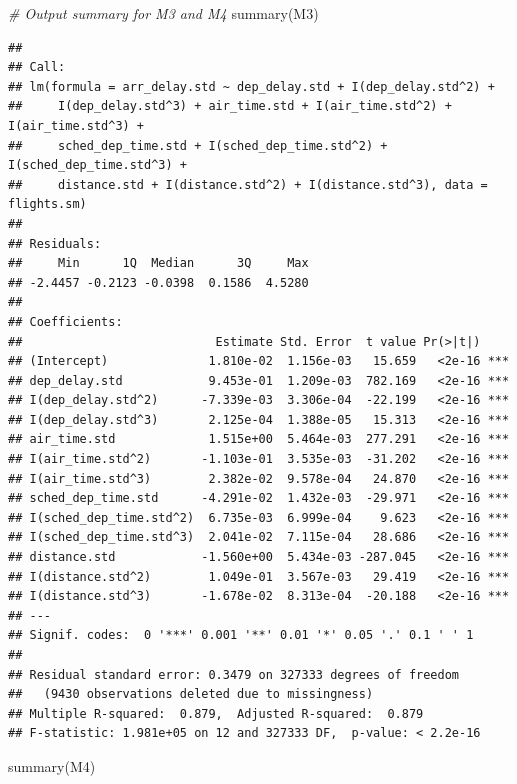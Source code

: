 \documentclass[
]{article}
\newenvironment{Shaded}{\begin{snugshade}}{\end{snugshade}}
\newcommand{\CommentTok}[1]{\textcolor[rgb]{0.56,0.35,0.01}{\textit{#1}}}
\newcommand{\FunctionTok}[1]{\textcolor[rgb]{0.00,0.00,0.00}{#1}}
\newcommand{\NormalTok}[1]{#1}
\begin{document}
\begin{Shaded}
\begin{Highlighting}[]
\CommentTok{\# Output summary for M3 and M4}
\FunctionTok{summary}\NormalTok{(M3)}
\end{Highlighting}
\end{Shaded}

\begin{verbatim}
## 
## Call:
## lm(formula = arr_delay.std ~ dep_delay.std + I(dep_delay.std^2) + 
##     I(dep_delay.std^3) + air_time.std + I(air_time.std^2) + I(air_time.std^3) + 
##     sched_dep_time.std + I(sched_dep_time.std^2) + I(sched_dep_time.std^3) + 
##     distance.std + I(distance.std^2) + I(distance.std^3), data = flights.sm)
## 
## Residuals:
##     Min      1Q  Median      3Q     Max 
## -2.4457 -0.2123 -0.0398  0.1586  4.5280 
## 
## Coefficients:
##                           Estimate Std. Error  t value Pr(>|t|)    
## (Intercept)              1.810e-02  1.156e-03   15.659   <2e-16 ***
## dep_delay.std            9.453e-01  1.209e-03  782.169   <2e-16 ***
## I(dep_delay.std^2)      -7.339e-03  3.306e-04  -22.199   <2e-16 ***
## I(dep_delay.std^3)       2.125e-04  1.388e-05   15.313   <2e-16 ***
## air_time.std             1.515e+00  5.464e-03  277.291   <2e-16 ***
## I(air_time.std^2)       -1.103e-01  3.535e-03  -31.202   <2e-16 ***
## I(air_time.std^3)        2.382e-02  9.578e-04   24.870   <2e-16 ***
## sched_dep_time.std      -4.291e-02  1.432e-03  -29.971   <2e-16 ***
## I(sched_dep_time.std^2)  6.735e-03  6.999e-04    9.623   <2e-16 ***
## I(sched_dep_time.std^3)  2.041e-02  7.115e-04   28.686   <2e-16 ***
## distance.std            -1.560e+00  5.434e-03 -287.045   <2e-16 ***
## I(distance.std^2)        1.049e-01  3.567e-03   29.419   <2e-16 ***
## I(distance.std^3)       -1.678e-02  8.313e-04  -20.188   <2e-16 ***
## ---
## Signif. codes:  0 '***' 0.001 '**' 0.01 '*' 0.05 '.' 0.1 ' ' 1
## 
## Residual standard error: 0.3479 on 327333 degrees of freedom
##   (9430 observations deleted due to missingness)
## Multiple R-squared:  0.879,  Adjusted R-squared:  0.879 
## F-statistic: 1.981e+05 on 12 and 327333 DF,  p-value: < 2.2e-16
\end{verbatim}

\begin{Shaded}
\begin{Highlighting}[]
\FunctionTok{summary}\NormalTok{(M4)}
\end{Highlighting}
\end{Shaded}
\end{document}
